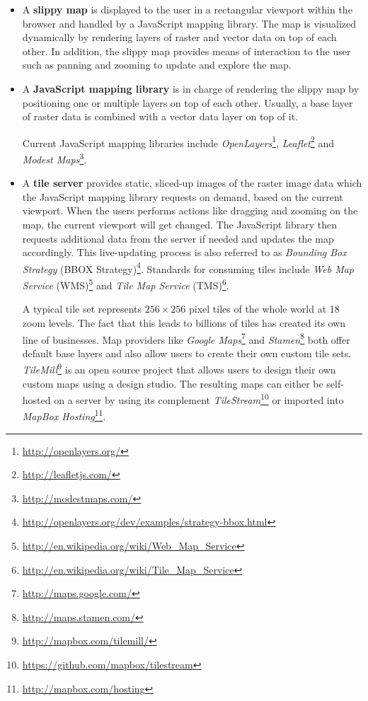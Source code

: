 \begin{itemize}

\item A \textbf{slippy map} is displayed to the user in a rectangular viewport within the browser and handled by a JavaScript mapping library. The map is visualized dynamically by rendering layers of raster and vector data on top of each other. In addition, the slippy map provides means of interaction to the user such as panning and zooming to update and explore the map. 

\item A \textbf{JavaScript mapping library} is in charge of rendering the slippy map by positioning one or multiple layers on top of each other. Usually, a base layer of raster data is combined with a vector data layer on top of it.

Current JavaScript mapping libraries include \textit{OpenLayers}\footnote{\url{http://openlayers.org/}}, \textit{Leaflet}\footnote{\url{http://leafletjs.com/}} and \textit{Modest Maps}\footnote{\url{http://modestmaps.com/}}.

\item A \textbf{tile server} provides static, sliced-up images of the raster image data which the JavaScript mapping library requests on demand, based on the current viewport. When the users performs actions like dragging and zooming on the map, the current viewport will get changed. The JavaScript library then requests additional data from the server if needed and updates the map accordingly. This live-updating process is also referred to as \textit{Bounding Box Strategy} (BBOX Strategy)\footnote{\url{http://openlayers.org/dev/examples/strategy-bbox.html}}. Standards for consuming tiles include \textit{Web Map Service} (WMS)\footnote{\url{http://en.wikipedia.org/wiki/Web_Map_Service}} and \textit{Tile Map Service} (TMS)\footnote{\url{http://en.wikipedia.org/wiki/Tile_Map_Service}}.

A typical tile set represents $256 \times 256$ pixel tiles of the whole world at 18 zoom levels. The fact that this leads to billions of tiles has created its own line of businesses. Map providers like \textit{Google Maps}\footnote{\url{http://maps.google.com/}} and \textit{Stamen}\footnote{\url{http://maps.stamen.com/}} both offer default base layers and also allow users to create their own custom tile sets. \textit{TileMill}\footnote{\url{http://mapbox.com/tilemill/}} is an open source project that allows users to design their own custom maps using a design studio. The resulting maps can either be self-hosted on a server by using its complement \textit{TileStream}\footnote{\url{https://github.com/mapbox/tilestream}} or imported into \textit{MapBox Hosting}\footnote{\url{http://mapbox.com/hosting}}.  


\end{itemize}
